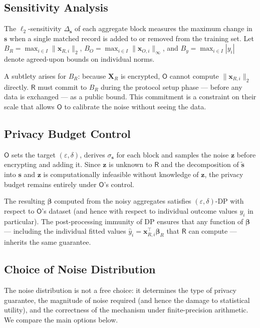 \documentclass[12pt]{article}
\theoremstyle{definition}
\theoremstyle{plain}
\newcommand{\bXR}{\mathbf{X}_{R}}
\newcommand{\bbeta}{\boldsymbol{\beta}}
\newcommand{\Party}[1]{\textsf{#1}}
\begin{document}
\subsection{Sensitivity Analysis}
\label{sec:dp:sens}

The $\ell_{2}$-sensitivity $\Delta_{\mathbf{s}}$ of each aggregate block measures the maximum change in
$\mathbf{s}$ when a single matched record is added to or removed from the training set. Let $B_{R} =
\max_{i \in I}\|\mathbf{x}_{R,i}\|_{2}$, $B_{O} = \max_{i \in I}\|\mathbf{x}_{O,i}\|_{\infty}$, and
$B_{y} = \max_{i \in I}|y_{i}|$ denote agreed-upon bounds on individual norms.



\noindent A subtlety arises for $B_{R}$: because $\bXR$ is encrypted, $\Party{O}$ cannot compute
$\|\mathbf{x}_{R,i}\|_{2}$ directly. $\Party{R}$ must commit to $B_{R}$ during the protocol setup
phase --- before any data is exchanged --- as a public bound. This commitment  is a constraint on their scale that allows $\Party{O}$ to calibrate the
noise without seeing the data.

\subsection{Privacy Budget Control}

$\Party{O}$ sets the target $(\varepsilon, \delta)$, derives $\sigma_{\mathbf{s}}$ for each block and samples the noise $\mathbf{z}$ before encrypting and adding it. Since
$\mathbf{z}$ is unknown to $\Party{R}$ and the decomposition of $\tilde{\mathbf{s}}$ into $\mathbf{s}$
and $\mathbf{z}$ is computationally infeasible without knowledge of $\mathbf{z}$, the privacy budget
remains entirely under $\Party{O}$'s control.

The resulting $\bbeta$ computed from the noisy aggregates satisfies $(\varepsilon, \delta)$-DP
with respect to $\Party{O}$'s dataset (and hence with respect to individual outcome values $y_{i}$
in particular). The post-processing immunity of DP ensures that any function of $\bbeta$ --- including
the individual fitted values $\hat{y}_{i} = \mathbf{x}_{R,i}^{\top}\bbeta_{R}$ that $\Party{R}$ can
compute --- inherits the same guarantee.

\subsection{Choice of Noise Distribution}
\label{sec:dp:noise_choice}

The noise distribution is not a free choice: it determines the type of privacy guarantee, the
magnitude of noise required (and hence the damage to statistical utility), and the correctness of
the mechanism under finite-precision arithmetic. We compare the main options below.
\end{document}

